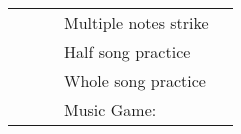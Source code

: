 \begin{sidewaystable}[tbp]
\begin{tabular}{|c|c|c|l|l|}
                   &                                                                                   &                                                                                                                                                           & \hspace{5mm}Multiple   notes strike                                                                                                                            &                                                                                                                                                                                                                                                      \\
                   &                                                                                   &                                                                                                                                                           & \hspace{5mm}Half   song practice                                                                                                                               &                                                                                                                                                                                                                                                      \\
                   &                                                                                   &                                                                                                                                                           & \hspace{5mm}Whole   song practice                                                                                                                              &                                                                                                                                                                                                                                                      \\
                   &                                                                                   &                                                                                                                                                           & Music   Game:                                                                                                                                      &                                                                                                                                                                                                                                                      \\

\end{tabular}
\end{sidewaystable}
